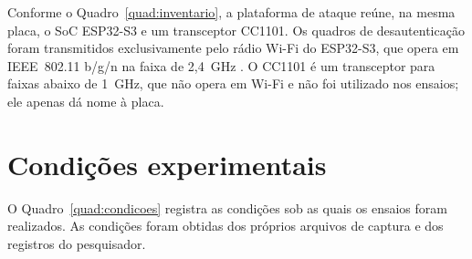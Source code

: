 Conforme o Quadro~\ref{quad:inventario}, a plataforma de ataque reúne, na mesma placa, o SoC ESP32-S3 e um transceptor CC1101. Os quadros de desautenticação foram transmitidos exclusivamente pelo rádio Wi-Fi do ESP32-S3, que opera em IEEE~802.11 b/g/n na faixa de 2,4~GHz \cite{EspressifS3Datasheet}. O CC1101 é um transceptor para faixas abaixo de 1~GHz, que não opera em Wi-Fi e não foi utilizado nos ensaios; ele apenas dá nome à placa.

\section{Condições experimentais}
\label{sec:condicoes_experimentais}

O Quadro~\ref{quad:condicoes} registra as condições sob as quais os ensaios foram realizados. As condições foram obtidas dos próprios arquivos de captura e dos registros do pesquisador.

